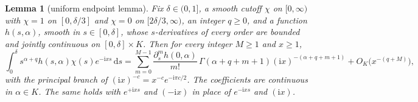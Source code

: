 \documentclass[11pt]{article}
\numberwithin{equation}{section}
\newtheorem{lemma}[theorem]{Lemma}
\theoremstyle{remark}
\newcommand{\ii}{\mathrm{i}}
\newcommand{\dd}{\,\mathrm{d}}
\begin{document}
\begin{lemma}[uniform endpoint lemma]\label{lem:watson}
Fix $\delta\in(0,1]$, a smooth cutoff $\chi$ on $[0,\infty)$ with
$\chi=1$ on $[0,\delta/3]$ and $\chi=0$ on $[2\delta/3,\infty)$, an
integer $q\ge0$, and a function $h(s,\alpha)$, smooth in
$s\in[0,\delta]$, whose $s$-derivatives of every order are bounded and
jointly continuous on $[0,\delta]\times K$. Then for every integer $M\ge1$
and $x\ge1$,
\begin{equation}\label{eq:watson}
 \int_0^\delta s^{\alpha+q}h(s,\alpha)\chi(s)e^{-\ii xs}\dd s
 =\sum_{m=0}^{M-1}\frac{\partial_s^m h(0,\alpha)}{m!}\,
   \Gamma(\alpha+q+m+1)(\ii x)^{-(\alpha+q+m+1)}
 +O_K\bigl(x^{-(q+M)}\bigr),
\end{equation}
with the principal branch of $(\ii x)^{-c}=x^{-c}e^{-\ii\pi c/2}$.
The coefficients are continuous in $\alpha\in K$. The same holds with
$e^{+\ii xs}$ and $(-\ii x)$ in place of $e^{-\ii xs}$ and $(\ii x)$.
\end{lemma}
\end{document}

